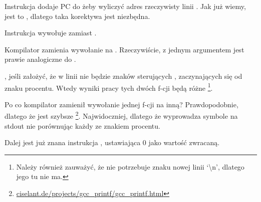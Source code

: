 Instrukcja  dodaje \ac{PC} do  żeby wyliczyć adres rzeczywisty linii . Jak już wiemy, jest to \q{\PICcode}, dlatego taka korektywa jest niezbędna.

Instrukcja  wywołuje \puts zamiast \printf.

\label{puts}
Kompilator zamienia wywołanie \printf na \puts. 
Rzeczywiście, \printf z jednym argumentem jest prawie analogiczne do \puts.
 
, jeśli założyć, że w linii nie będzie znaków sterujących \printf, 
zaczynających się od znaku procentu. Wtedy wyniki pracy tych dwóch f-cji będą różne
\footnote{Należy również zauważyć, że \puts nie potrzebuje znaku nowej linii `\textbackslash{}n',
dlatego jego tu nie ma.}.

Po co kompilator zamienił wywołanie jednej f-cji na inną? Prawdopodobnie, dlatego że \puts jest szybsze
\footnote{\href{http://go.yurichev.com/17063}{ciselant.de/projects/gcc\_printf/gcc\_printf.html}}. 
Najwidoczniej, dlatego że \puts wyprowadza symbole na \gls{stdout} nie porównując każdy ze znakiem procentu.

Dalej jest już znana instrukcja , ustawiająca 0 jako wartość zwracaną.


